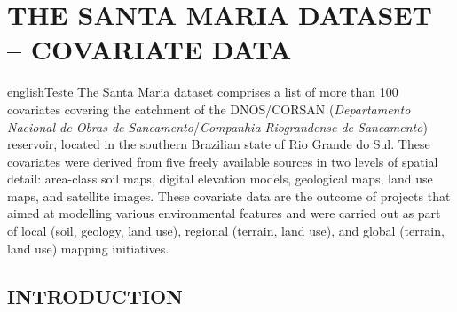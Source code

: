 \artigotrue
\chapter{THE SANTA MARIA DATASET -- COVARIATE DATA}
\label{chap:chap05}



% 

\def\enkeys{Teste}
  
\begin{chapterabstract}{english}{\enkeys}
The Santa Maria dataset comprises a list of more than 100 covariates covering the catchment of the DNOS/CORSAN 
(\textit{Departamento Nacional de Obras de Saneamento}/\textit{Companhia Riograndense de Saneamento}) 
reservoir, 
located in the southern Brazilian state of Rio Grande do Sul. These covariates were derived from five freely 
available sources in two levels of spatial detail: area-class soil maps, digital elevation models, geological 
maps, land use maps, 
and satellite images. These covariate data are the outcome of projects that aimed at modelling various 
environmental 
features and were carried out as part of local (soil, geology, land use), regional (terrain, land use), and 
global (terrain, 
land use) mapping initiatives.
\end{chapterabstract}

\formatchapter

\section{INTRODUCTION}
\label{sec:covar-data-intro}


